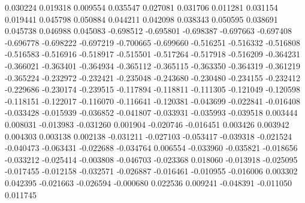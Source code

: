 0.030224
0.019318
0.009554
0.035547
0.027081
0.031706
0.011281
0.031154
0.019441
0.045798
0.050884
0.044211
0.042098
0.038343
0.050595
0.038691
0.045738
0.046988
0.045083
-0.698512
-0.695801
-0.698387
-0.697663
-0.697408
-0.696778
-0.698222
-0.697219
-0.700665
-0.699660
-0.516251
-0.516332
-0.516808
-0.516583
-0.516916
-0.518917
-0.515501
-0.517264
-0.517918
-0.516209
-0.364231
-0.366021
-0.363401
-0.364934
-0.365112
-0.365115
-0.363350
-0.364319
-0.361219
-0.365224
-0.232972
-0.232421
-0.235048
-0.243680
-0.230480
-0.234155
-0.232412
-0.229686
-0.230174
-0.239515
-0.117894
-0.118811
-0.111305
-0.121049
-0.120598
-0.118151
-0.122017
-0.116070
-0.116641
-0.120381
-0.043699
-0.022841
-0.016408
-0.033428
-0.015939
-0.036852
-0.041807
-0.033931
-0.035993
-0.039518
0.003444
0.008031
-0.013983
-0.031260
0.001904
-0.020746
-0.016451
0.003426
0.003942
0.004303
0.003138
0.002138
-0.031211
-0.027103
-0.053417
-0.039318
-0.021524
-0.040473
-0.063431
-0.022688
-0.034764
0.006554
-0.033960
-0.035821
-0.018656
-0.033212
-0.025414
-0.003808
-0.046703
-0.023368
0.018060
-0.013918
-0.025095
-0.017455
-0.012158
-0.032571
-0.026887
-0.016461
-0.010955
-0.016006
0.003302
0.042395
-0.021663
-0.026594
-0.000680
0.022536
0.009241
-0.048391
-0.011050
0.011745
